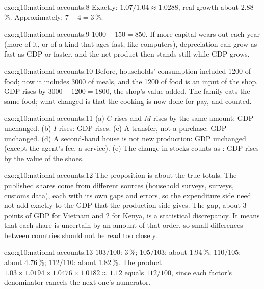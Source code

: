 \begin{solution}{exo:g10:national-accounts:8}
Exactly: $1.07/1.04 \approx 1.0288$, real growth about 2.88\,\%. Approximately: $7 - 4 = 3\,\%$.
\end{solution}

\begin{solution}{exo:g10:national-accounts:9}
$1000 - 150 = 850$. If more capital wears out each year (more of it, or of a kind that ages fast, like computers), depreciation can grow as fast as GDP or faster, and the
net product then stands still while GDP grows.
\end{solution}

\begin{solution}{exo:g10:national-accounts:10}
Before, households' consumption included 1200 of food; now it includes 3000 of meals, and the 1200 of food is an input of the shop. GDP rises by $3000 - 1200 = 1800$, the
shop's value added. The family eats the same food; what changed is that the cooking is now done for pay, and counted.
\end{solution}

\begin{solution}{exo:g10:national-accounts:11}
(a) $C$ rises and $M$ rises by the same amount: GDP unchanged. (b) $I$ rises: GDP rises. (c) A transfer, not a purchase: GDP unchanged. (d) A second-hand house is not new
production: GDP unchanged (except the agent's fee, a service). (e) The change in stocks counts as : GDP rises by the value of the shoes.
\end{solution}

\begin{solution}{exo:g10:national-accounts:12}
The proposition is about the true totals. The published shares come from different sources (household surveys,  surveys, customs data), each with its own gaps
and errors, so the expenditure side need not add exactly to the GDP that the production side gives. The gap, about 3 points of GDP for Vietnam and 2 for Kenya, is a
statistical discrepancy. It means that each share is uncertain by an amount of that order, so small differences between countries should not be read too closely.
\end{solution}

\begin{solution}{exo:g10:national-accounts:13}
$103/100$: 3\,\%; $105/103$: about 1.94\,\%; $110/105$: about 4.76\,\%; $112/110$: about 1.82\,\%. The product $1.03 \times 1.0194 \times 1.0476 \times 1.0182 \approx 1.12$ equals
$112/100$, since each factor's denominator cancels the next one's numerator.
\end{solution}

